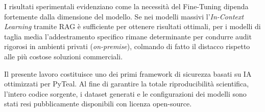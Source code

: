 I risultati sperimentali evidenziano come la necessità del Fine-Tuning dipenda fortemente dalla dimensione del modello. Se nei modelli massivi l'\textit{In-Context Learning} tramite RAG è sufficiente per ottenere risultati ottimali,
per i modelli di taglia media l'addestramento specifico rimane determinante per condurre audit rigorosi in ambienti privati (\textit{on-premise}), colmando di fatto il distacco rispetto alle più costose soluzioni commerciali.

Il presente lavoro costituisce uno dei primi framework di sicurezza basati su IA ottimizzati per PyTeal. Al fine di garantire la totale riproducibilità scientifica, l'intero codice sorgente, i dataset generati e le configurazioni dei modelli sono stati resi pubblicamente disponibili con licenza open-source.
